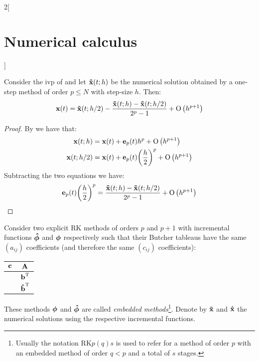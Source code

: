 \documentclass[../../../main_math.tex]{subfiles}
\begin{document}
\begin{multicols}{2}[\section{Numerical calculus}]
  \begin{theorem}
    Consider the ivp of  and let $\boldsymbol{\mathrm{\tilde{x}}}(t;h)$ be the numerical solution obtained by a one-step method of order $p\leq N$ with step-size $h$. Then:
    $$\boldsymbol{\mathrm{x}}(t)=\boldsymbol{\mathrm{\tilde{x}}}(t;h/2)-\frac{\boldsymbol{\mathrm{\tilde{x}}}(t;h)-\boldsymbol{\mathrm{\tilde{x}}}(t;h/2)}{2^p-1}+\mathrm{O}\left(h^{p+1}\right)$$
  \end{theorem}
  \begin{proof}
    By  we have that:
    \begin{align*}
      \boldsymbol{\mathrm{x}}(t;h)   & =\boldsymbol{\mathrm{x}}(t)+\boldsymbol{\mathrm{e}}_p(t)h^p+\mathrm{O}\left(h^{p+1}\right)                          \\
      \boldsymbol{\mathrm{x}}(t;h/2) & =\boldsymbol{\mathrm{x}}(t)+\boldsymbol{\mathrm{e}}_p(t){\left(\frac{h}{2}\right)}^p+\mathrm{O}\left(h^{p+1}\right)
    \end{align*}
    Subtracting the two equations we have:
    $$\boldsymbol{\mathrm{e}}_p(t){\left(\frac{h}{2}\right)}^p=\frac{\boldsymbol{\mathrm{\tilde{x}}}(t;h)-\boldsymbol{\mathrm{\tilde{x}}}(t;h/2)}{2^p-1}+\mathrm{O}\left(h^{p+1}\right)$$
  \end{proof}
  \begin{theorem}
    Consider two explicit RK methods of orders $p$ and $p+1$ with incremental functions $\boldsymbol{\mathrm{\hat\phi}}$ and $\boldsymbol{\mathrm{\phi}}$ respectively such that their Butcher tableaus have the same $(a_{ij})$ coefficients (and therefore the same $(c_{ij})$ coefficients):
    \begin{center}
      \renewcommand{\arraystretch}{1.25}
      \begin{tabular}{c|c}
        $\boldsymbol{\mathrm{c}}$ & $\boldsymbol{\mathrm{A}}$                   \\
        \hline
                 & ${\boldsymbol{\mathrm{b}}}^{\mathrm{T}}$       \\
                 & ${\boldsymbol{\mathrm{\hat{b}}}}^{\mathrm{T}}$
      \end{tabular}
    \end{center}
    These methods $\boldsymbol{\mathrm{\phi}}$ and $\boldsymbol{\mathrm{\hat\phi}}$ are called \emph{embedded methods}\footnote{Usually the notation $\mathrm{RK}p(q)s$ is used to refer for a method of order $p$ with an embedded method of order $q< p$ and a total of $s$ stages.}. Denote by $\boldsymbol{\mathrm{\tilde{x}}}$ and $\boldsymbol{\mathrm{\hat{x}}}$ the numerical solutions using the respective incremental functions.

\end{theorem}
\end{multicols}
\end{document}
